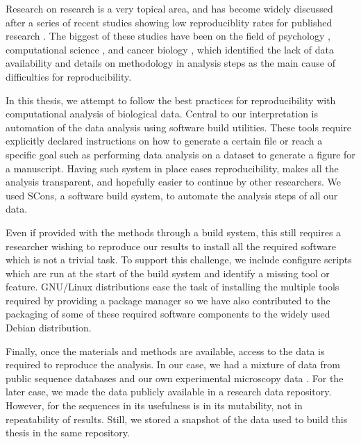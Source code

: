 
Research on research is a very topical area, and has become widely
discussed after a series of recent
studies showing low reproduciblity rates for
published research \citep{ioannidis2015meta}.  The
biggest of these studies have been on the field of
psychology \citep{open2015estimating},
computational science \citep{collberg2016repeatability},
and cancer biology \citep{prinz2011believe, ioannidis2009repeatability},
which identified the lack of data availability
and details on methodology in analysis steps as
the main cause of difficulties for reproducibility.

In this thesis, we attempt to follow the best practices for
reproducibility with computational analysis of biological data.
Central to our interpretation is automation of the data analysis using
software build utilities.  These tools require explicitly declared
instructions on how to generate a certain file or reach a specific
goal such as performing data analysis on a dataset to generate a
figure for a manuscript.  Having such system in place eases
reproducibility, makes all the analysis transparent, and hopefully
easier to continue by other researchers.
We used SCons, a software build system, to automate the analysis
steps of all our data.

Even if provided with the methods through a build system,
this still requires a researcher wishing to reproduce
our results to install all the required software which is not a
trivial task.  To support this challenge, we include
configure scripts which are run at the start of the build system and
identify a missing tool or feature.
GNU/Linux distributions ease
the task of installing the multiple tools required by providing a
package manager so we have also contributed to the packaging of
some of these required software components to the
widely used Debian distribution.

Finally, once the materials and methods are available, access to the
data is required to reproduce the analysis.  In our case, we had a
mixture of data from public sequence
databases  and our own experimental
microscopy data .  For the later case, we made the
data publicly available in a research data repository.  However, for
the sequences in  its usefulness is in its
mutability, not in repeatability of results.  Still, we stored a
snapshot of the data used to build this thesis in the same repository.

